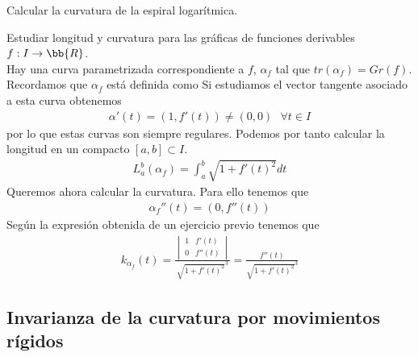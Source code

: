 \begin{ejercicio}
    Calcular la curvatura de la espiral logarítmica.
\end{ejercicio}

\begin{ejercicio}
    Estudiar longitud y curvatura para las gráficas de funciones derivables $f: I \to \bb{R}$.\\

    Hay una curva parametrizada correspondiente a $f$, $\alpha_f$ tal que $tr(\alpha_f) = Gr(f)$. Recordamos que $\alpha_f$ está definida como
    Si estudiamos el vector tangente asociado a esta curva obtenemos
    \begin{gather*}
        \alpha'(t) = (1,f'(t)) \neq (0,0) \ \ \ \forall t\in I
    \end{gather*}
    por lo que estas curvas son siempre regulares. Podemos por tanto calcular la longitud en un compacto $[a,b]\subset I$.
    \begin{gather*}
        L_a^b(\alpha_f) = \int_a^b \sqrt{1+f'(t)^2} dt
    \end{gather*}
    Queremos ahora calcular la curvatura. Para ello tenemos que 
    \begin{gather*}
        \alpha_f''(t) = (0,f''(t))
    \end{gather*}
    Según la expresión obtenida de un ejercicio previo tenemos que 
    \begin{gather*}
        k_{\alpha_f}(t) = \frac{\begin{vmatrix}
            1 & f'(t) \\ 0 & f''(t)
        \end{vmatrix}}{\sqrt{1+f'(t)^2}^3} = \frac{f''(t)}{\sqrt{1+f'(t)^2}^3}
    \end{gather*}
\end{ejercicio}

\subsection{Invarianza de la curvatura por movimientos rígidos}

